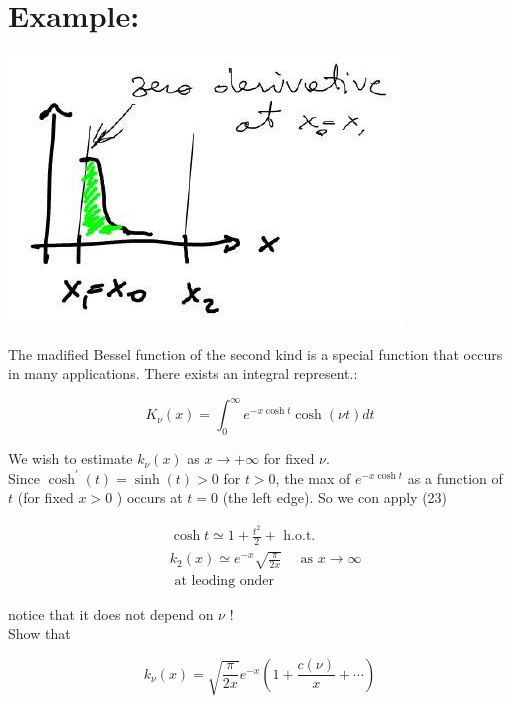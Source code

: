 \documentclass[10pt]{article}
\begin{document}
\section*{Example:}
\begin{center}
\includegraphics[max width=\textwidth]{2025_10_17_86b952e516931f75c0b7g-06(1)}
\end{center}

The madified Bessel function of the second kind is a special function that occurs in many applications. There exists an integral represent.:

$$
K_{\nu}(x)=\int_{0}^{\infty} e^{-x \cosh t} \cosh (\nu t) d t
$$

We wish to estimate $k_{\nu}(x)$ as $x \rightarrow+\infty$ for fixed $\nu$.\\
Since $\cosh ^{\prime}(t)=\sinh (t)>0$ for $t>0$, the max of $e^{-x \cosh t}$ as a function of $t$ (for fixed $x>0$ ) occurs at $t=0$ (the left edge). So we con apply (23)

$$
\begin{aligned}
& \cosh t \simeq 1+\frac{t^{2}}{2}+\text { h.o.t. } \\
& k_{2}(x) \simeq e^{-x} \sqrt{\frac{\pi}{2 x}} \quad \text { as } x \rightarrow \infty \\
& \text { at leoding onder }
\end{aligned}
$$

notice that it does not depend on $\nu$ !\\
Show that

$$
k_{\nu}(x)=\sqrt{\frac{\pi}{2 x}} e^{-x}\left(1+\frac{c(\nu)}{x}+\cdots\right)
$$
\end{document}
